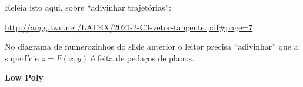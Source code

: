 \documentclass[oneside,12pt]{article}
\begin{document}
\ssk

Releia isto aqui, sobre ``adivinhar trajetórias'':

\ssk

{\footnotesize

\url{http://angg.twu.net/LATEX/2021-2-C3-vetor-tangente.pdf\#page=7}

}

\msk

No diagrama de numerozinhos do slide anterior o leitor precisa
``adivinhar'' que a superfície $z=F(x,y)$ é feita de pedaços de
planos.

\newpage

%


{\bf Low Poly}
\end{document}
